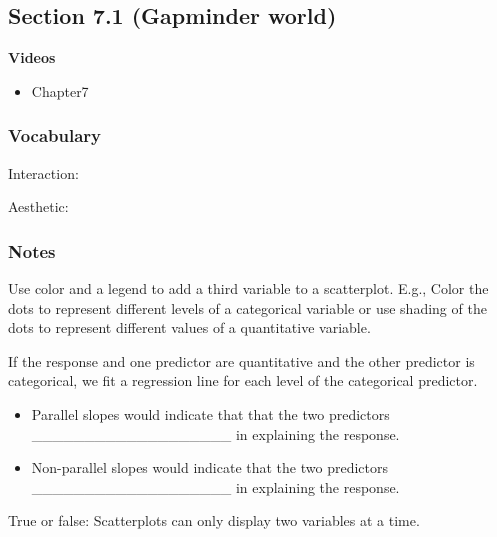 \documentclass[
]{report}
\providecommand{\tightlist}{%
  \setlength{\itemsep}{0pt}\setlength{\parskip}{0pt}}
\newcommand{\rgs}{\vspace{12pt}} %
\begin{document}
\hypertarget{section-7.1-gapminder-world}{%
\subsection*{Section 7.1 (Gapminder world)}\label{section-7.1-gapminder-world}}


\textbf{Videos}

\begin{itemize}
\tightlist
\item
  Chapter7
\end{itemize}


\hypertarget{vocabulary-8}{%
\subsubsection*{Vocabulary}\label{vocabulary-8}}

Interaction:
\rgs

Aesthetic:
\rgs

\hypertarget{notes-11}{%
\subsubsection*{Notes}\label{notes-11}}

Use color and a legend to add a third variable to a scatterplot. E.g., Color the dots to represent different levels of a categorical variable or use shading of the dots to represent different values of a quantitative variable.

If the response and one predictor are quantitative and the other predictor is categorical, we fit a regression line for each level of the categorical predictor.

\begin{itemize}
\item
  Parallel slopes would indicate that that the two predictors \_\_\_\_\_\_\_\_\_\_\_\_\_\_\_\_\_\_\_ in explaining the response.
\item
  Non-parallel slopes would indicate that the two predictors \_\_\_\_\_\_\_\_\_\_\_\_\_\_\_\_\_\_\_ in explaining the response.
\end{itemize}

True or false: Scatterplots can only display two variables at a time.
\end{document}
